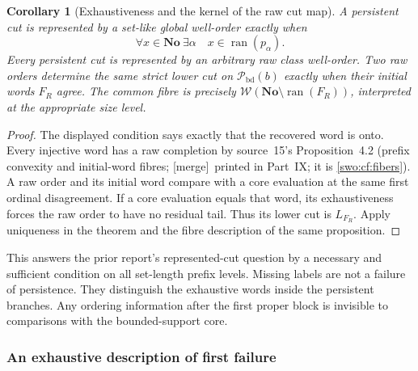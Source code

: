 \documentclass[11pt]{article}
\newtheorem{corollary}[corollary]{Corollary}
\theoremstyle{definition}
\theoremstyle{remark}
\newcommand{\No}{\mathbf{No}}
\newcommand{\WO}{\mathcal W}
\newcommand{\Pbd}{\mathcal P_{\mathrm{bd}}}
\newcommand{\ran}{\operatorname{ran}}
\newcommand{\merge}{\textsf{[merge]}}
\begin{document}
\begin{corollary}[Exhaustiveness and the kernel of the raw cut map]\label{swo:cb:cor:kernel}
A persistent cut is represented by a set-like global well-order exactly when
\[
 \forall x\in\No\ \exists\alpha\quad x\in\ran(p_\alpha).
\]
Every persistent cut is represented by an arbitrary raw class well-order.
Two raw orders determine the same strict lower cut on $\Pbd(b)$ exactly when
their initial words $F_R$ agree. The common fibre is precisely
$\WO(\No\setminus\ran(F_R))$, interpreted at the appropriate size level.
\end{corollary}
\begin{proof}
The displayed condition says exactly that the recovered word is onto.
Every injective word has a raw completion by source~15's Proposition~4.2
(prefix convexity and initial-word fibres; \merge\ printed in Part~IX; it is
\cref{swo:cf:fibers}).
A raw order and its initial word compare with a core evaluation at the
same first ordinal disagreement. If a core evaluation equals that word,
its exhaustiveness forces the raw order to have no residual tail.
Thus its lower cut is $L_{F_R}$. Apply uniqueness in the theorem and the
fibre description of the same proposition.
\end{proof}

This answers the prior report's represented-cut question by a necessary
and sufficient condition on all set-length prefix levels. Missing labels
are not a failure of persistence. They distinguish the exhaustive words
inside the persistent branches. Any ordering information after the first
proper block is invisible to comparisons with the bounded-support core.

\subsubsection{An exhaustive description of first failure}
\end{document}
